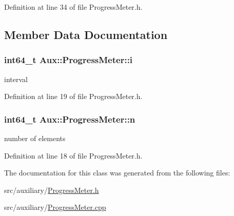 Definition at line 34 of file Progress\-Meter.\-h.



\subsection{Member Data Documentation}
\hypertarget{class_aux_1_1_progress_meter_a9010eced162c940f8e790efa6b7b7951}{
\subsubsection[{i}]{\setlength{\rightskip}{0pt plus 5cm}int64\-\_\-t Aux\-::\-Progress\-Meter\-::i\hspace{0.3cm}{\ttfamily [protected]}}}\label{class_aux_1_1_progress_meter_a9010eced162c940f8e790efa6b7b7951}


interval 



Definition at line 19 of file Progress\-Meter.\-h.

\hypertarget{class_aux_1_1_progress_meter_aff17aa3d8448d8bcc181ba9c5752a994}{
\subsubsection[{n}]{\setlength{\rightskip}{0pt plus 5cm}int64\-\_\-t Aux\-::\-Progress\-Meter\-::n\hspace{0.3cm}{\ttfamily [protected]}}}\label{class_aux_1_1_progress_meter_aff17aa3d8448d8bcc181ba9c5752a994}


number of elements 



Definition at line 18 of file Progress\-Meter.\-h.



The documentation for this class was generated from the following files\-:\begin{DoxyCompactItemize}
\item 
src/auxiliary/\hyperlink{_progress_meter_8h}{Progress\-Meter.\-h}\item 
src/auxiliary/\hyperlink{_progress_meter_8cpp}{Progress\-Meter.\-cpp}\end{DoxyCompactItemize}
